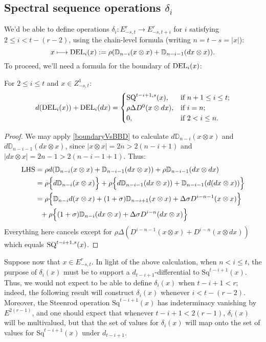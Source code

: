 \documentclass[10pt]{article}
\newcommand{\twist}{\sigma}
\newcommand{\Sq}{\mathrm{Sq}}
\begin{document}
\begin{AdamsSSEQ operations final}
\subsection{Spectral sequence operations $\delta_i$}
We'd be able to define operations $\delta_i:E^r_{-s,t}\to E^r_{-s,t+i}$ for $i$ satisfying $2\leq i<t-(r-2)$, using the chain-level formula (writing $n=t-s=|x|$):
\[x\mapsto \textup{DEL}_{i}(x):=\rho(\mathbb{D}_{n-i}(x\otimes x)+\mathbb{D}_{n-i-1}(dx\otimes x)).\]
To proceed, we'll need a formula for the boundary of $\textup{DEL}_i(x)$:
\begin{prop}
\label{dvsDEL}
For $2\leq i\leq t$ and $x\in Z^1_{-s,t}$:
\[d(\textup{DEL}_i(x))+ \textup{DEL}_i(dx)=\begin{cases}
\textup{SQ}^{t-i+1,s}(x),&\textup{if }n+1\leq i \leq t;\\
\rho\Delta D^0(x\otimes dx),&\textup{if }i=n;\\
0,&\textup{if }2< i\leq n.
\end{cases}\]
\end{prop}
\begin{proof}
We may apply \ref{boundaryVsBBD} to calculate $d\mathbb{D}_{n-i}(x\otimes x)$ and $d\mathbb{D}_{n-i-1}(dx\otimes x)$, since $|x\otimes x|=2n> 2(n-i+1)$ and $|dx\otimes x|=2n-1> 2(n-i-1+1)$. Thus:
\begin{alignat*}{2}
\textup{LHS}
&=
\rho d(\mathbb{D}_{n-i}(x\otimes x)+\mathbb{D}_{n-i-1}(dx\otimes x))+\rho\mathbb{D}_{n-i-1}(dx\otimes dx)%
\\
&=
\rho\Bigl\{d\mathbb{D}_{n-i}(x\otimes x)\Bigr\}+\rho\Bigl\{d\mathbb{D}_{n-i-1}(dx\otimes x))+\mathbb{D}_{n-i-1}(d(dx\otimes x))\Bigr\}%
\\
&=
\rho\Bigl\{\mathbb{D}_{n-i}d(x\otimes x)+(1+\twist)\mathbb{D}_{n-i+1}(x\otimes x)+\Delta\sigma D^{i-n-1}(x\otimes x)\Bigr\}
\\
&\ \ +\rho\Bigl\{(1+\twist)\mathbb{D}_{n-i}(dx\otimes x)+\Delta\sigma D^{i-n}(dx\otimes x)\Bigr\}
\end{alignat*}
Everything here cancels except for $\rho\Delta(D^{i-n-1}(x\otimes x)+D^{i-n}(x\otimes dx))$ which equals $\textup{SQ}^{t-i+1,s}(x)$.
\end{proof}
Suppose now that $x\in E^r_{-s,t}$. In light of the above calculation, when $n<i\leq t$, the purpose of $\delta_i(x)$ must be to support a $d_{t-i+1}$-differential to $\Sq^{t-i+1}(x)$. Thus, we would not expect to be able to define $\delta_i(x)$ when $t-i+1<r$; indeed, the following result will construct $\delta_i(x)$ whenever $i<t-(r-2)$. Moreover, the Steenrod operation $\Sq^{t-i+1}(x)$ has indeterminacy vanishing by $E^{2(r-1)}$, and one should expect that whenever $t-i+1<2(r-1)$, $\delta_i(x)$ will be multivalued, but that the set of values for $\delta_i(x)$ will map onto the set of values for $\Sq^{t-i+1}(x)$ under $d_{t-i+1}$.%

\end{AdamsSSEQ operations final}
\end{document}
